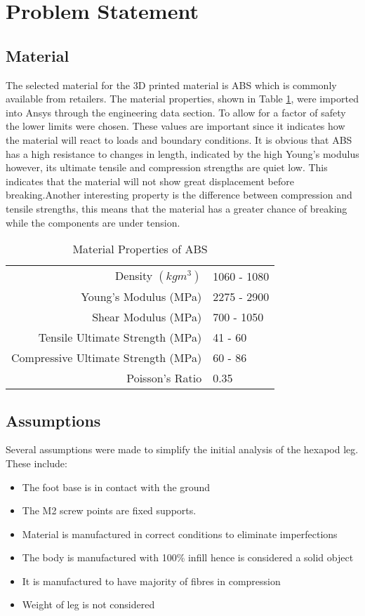 \documentclass[a4paper]{article}
\begin{document}
\section{Problem Statement}
\subsection{Material}
The selected material for the 3D printed material is ABS which is commonly available from retailers. The material properties, shown in Table \ref{tab:ABSProperties}, were imported into Ansys through the engineering data section. To allow for a factor of safety the lower limits were chosen. These values are important since it indicates how the material will react to loads and boundary conditions. It is obvious that ABS has a high resistance to changes in length, indicated by the high Young's modulus however, its ultimate tensile and compression strengths are quiet low. This indicates that the material will not show great displacement before breaking.Another interesting property is the difference between compression and tensile strengths, this means that the material has a greater chance of breaking while the components are under tension.  
\begin{table}[h]
	\centering
	\caption{\label{tab:ABSProperties}Material Properties of ABS \cite{Matbase} }
	\begin{tabular}{r| l}
		Density $(kgm^3)$ & 1060 - 1080 \\
		Young's Modulus (MPa) & 2275 - 2900 \\ 
		Shear Modulus (MPa) &  700 - 1050 \\
		Tensile Ultimate Strength (MPa) & 41 - 60 \\
		Compressive Ultimate Strength (MPa) & 60 - 86 \\
		Poisson's Ratio & 0.35\\
	\end{tabular}
\end{table}
\subsection{Assumptions}
Several assumptions were made to simplify the initial analysis of the hexapod leg. These include:
\begin{itemize}
	\item The foot base is in contact with the ground 
	\item The M2 screw points are fixed supports. 
	\item Material is manufactured in correct conditions to eliminate imperfections
	\item The body is manufactured with 100\% infill hence is considered a solid object
	\item It is manufactured to have majority of fibres in compression
	\item Weight of leg is not considered
\end{itemize}
\end{document}
